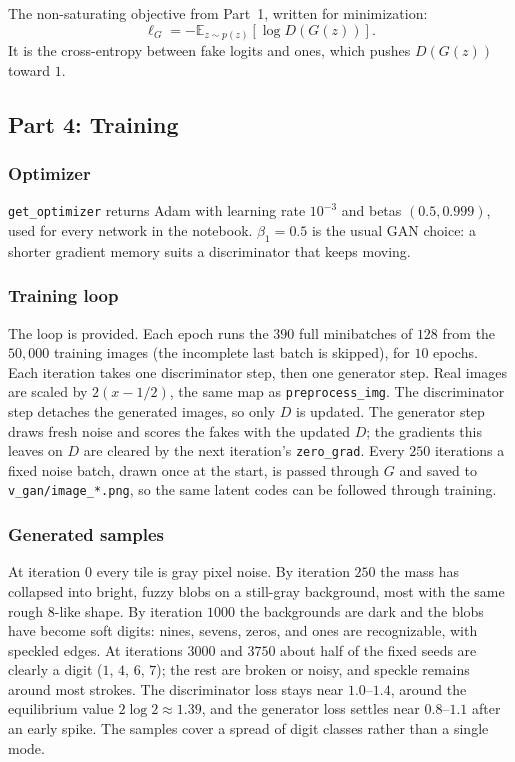 The non-saturating objective from Part~1, written for minimization:
\[
  \ell_G = -\mathbb{E}_{z \sim p(z)}\!\left[\log D(G(z))\right].
\]
It is the cross-entropy between fake logits and ones, which pushes \(D(G(z))\) toward \(1\).

\subsection{Part 4: Training}

\subsubsection{Optimizer}

\texttt{get\_optimizer} returns Adam with learning rate \(10^{-3}\) and betas \((0.5, 0.999)\), used for every network in the notebook. \(\beta_1 = 0.5\) is the usual GAN choice: a shorter gradient memory suits a discriminator that keeps moving.

\subsubsection{Training loop}

The loop is provided. Each epoch runs the \(390\) full minibatches of \(128\) from the \(50{,}000\) training images (the incomplete last batch is skipped), for \(10\) epochs. Each iteration takes one discriminator step, then one generator step. Real images are scaled by \(2(x - 1/2)\), the same map as \texttt{preprocess\_img}. The discriminator step detaches the generated images, so only \(D\) is updated. The generator step draws fresh noise and scores the fakes with the updated \(D\); the gradients this leaves on \(D\) are cleared by the next iteration's \texttt{zero\_grad}. Every \(250\) iterations a fixed noise batch, drawn once at the start, is passed through \(G\) and saved to \texttt{v\_gan/image\_*.png}, so the same latent codes can be followed through training.

\subsubsection{Generated samples}

At iteration \(0\) every tile is gray pixel noise. By iteration \(250\) the mass has collapsed into bright, fuzzy blobs on a still-gray background, most with the same rough 8-like shape. By iteration \(1000\) the backgrounds are dark and the blobs have become soft digits: nines, sevens, zeros, and ones are recognizable, with speckled edges. At iterations \(3000\) and \(3750\) about half of the fixed seeds are clearly a digit (\(1\), \(4\), \(6\), \(7\)); the rest are broken or noisy, and speckle remains around most strokes. The discriminator loss stays near \(1.0\)--\(1.4\), around the equilibrium value \(2\log 2 \approx 1.39\), and the generator loss settles near \(0.8\)--\(1.1\) after an early spike. The samples cover a spread of digit classes rather than a single mode.

